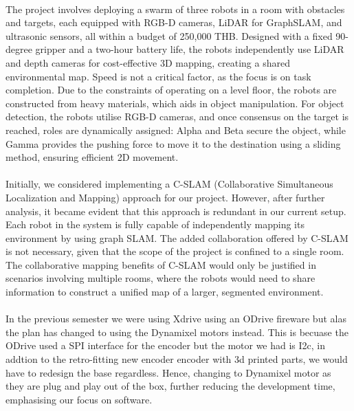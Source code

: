 \paragraph*{}
The project involves deploying a swarm of three robots in a room with obstacles and targets, each equipped with RGB-D cameras, LiDAR for GraphSLAM, and ultrasonic sensors, all within a budget of 250,000 THB. Designed with a fixed 90-degree gripper and a two-hour battery life, the robots independently use LiDAR and depth cameras for cost-effective 3D mapping, creating a shared environmental map. Speed is not a critical factor, as the focus is on task completion. Due to the constraints of operating on a level floor, the robots are constructed from heavy materials, which aids in object manipulation. For object detection, the robots utilise RGB-D cameras, and once consensus on the target is reached, roles are dynamically assigned: Alpha and Beta secure the object, while Gamma provides the pushing force to move it to the destination using a sliding method, ensuring efficient 2D movement.

\paragraph*{}
Initially, we considered implementing a C-SLAM (Collaborative Simultaneous Localization and Mapping) approach for our project. However, after further analysis, it became evident that this approach is redundant in our current setup. Each robot in the system is fully capable of independently mapping its environment by using graph SLAM. The added collaboration offered by C-SLAM is not necessary, given that the scope of the project is confined to a single room. The collaborative mapping benefits of C-SLAM would only be justified in scenarios involving multiple rooms, where the robots would need to share information to construct a unified map of a larger, segmented environment.

\paragraph*{}
In the previous semester we were using Xdrive using an ODrive fireware but alas the plan has changed to using the Dynamixel motors instead. This is becuase the ODrive used a SPI interface for the encoder but the motor we had is I2c, in addtion to the retro-fitting new encoder encoder with 3d printed parts, we would have to redesign the base regardless. Hence, changing to Dynamixel motor as they are plug and play out of the box, further reducing the development time, emphasising our focus on software.